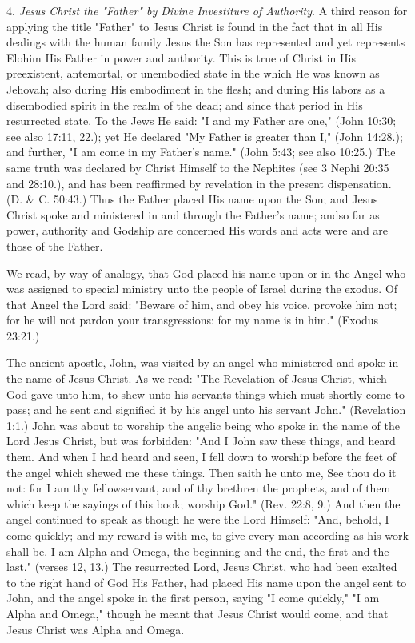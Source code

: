 4. \textit{Jesus Christ the "Father" by Divine Investiture of Authority}. A third reason for applying
the title "Father" to Jesus Christ is found in the fact that in all His dealings with the human
family Jesus the Son has represented and yet represents Elohim His Father in power and
authority. This is true of Christ in His preexistent, antemortal, or unembodied state in the
which He was known as Jehovah; also during His embodiment in the flesh; and during His
labors as a disembodied spirit in the realm of the dead; and since that period in His
resurrected state. To the Jews He said: "I and my Father are one," (John 10:30; see also
17:11, 22.); yet He declared "My Father is greater than I," (John 14:28.); and further, "I am
come in my Father's name." (John 5:43; see also 10:25.) The same truth was declared by
Christ Himself to the Nephites (see 3 Nephi 20:35 and 28:10.), and has been reaffirmed by
revelation in the present dispensation. (D. \& C. 50:43.) Thus the Father placed His name
upon the Son; and Jesus Christ spoke and ministered in and through the Father's name; andso far as power, authority and Godship are concerned His words and acts were and are those
of the Father.

We read, by way of analogy, that God placed his name upon or in the Angel who was
assigned to special ministry unto the people of Israel during the exodus. Of that Angel the
Lord said: "Beware of him, and obey his voice, provoke him not; for he will not pardon your
transgressions: for my name is in him." (Exodus 23:21.)

The ancient apostle, John, was visited by an angel who ministered and spoke in the name of
Jesus Christ. As we read: "The Revelation of Jesus Christ, which God gave unto him, to shew
unto his servants things which must shortly come to pass; and he sent and signified it by his
angel unto his servant John." (Revelation 1:1.) John was about to worship the angelic being
who spoke in the name of the Lord Jesus Christ, but was forbidden: "And I John saw these
things, and heard them. And when I had heard and seen, I fell down to worship before the
feet of the angel which shewed me these things. Then saith he unto me, See thou do it not:
for I am thy fellowservant, and of thy brethren the prophets, and of them which keep the
sayings of this book; worship God." (Rev. 22:8, 9.) And then the angel continued to speak as
though he were the Lord Himself: "And, behold, I come quickly; and my reward is with me,
to give every man according as his work shall be. I am Alpha and Omega, the beginning and
the end, the first and the last." (verses 12, 13.) The resurrected Lord, Jesus Christ, who had
been exalted to the right hand of God His Father, had placed His name upon the angel sent to
John, and the angel spoke in the first person, saying "I come quickly," "I am Alpha and
Omega," though he meant that Jesus Christ would come, and that Jesus Christ was Alpha and
Omega.

